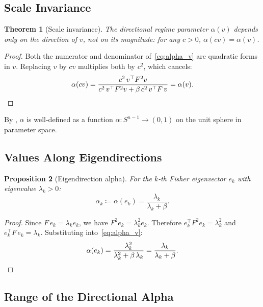 \documentclass[11pt,a4paper]{article}
\theoremstyle{plain}
\newtheorem{theorem}{Theorem}[section]
\newtheorem{proposition}[theorem]{Proposition}
\theoremstyle{definition}
\newcommand{\Sn}{S^{n-1}}
\begin{document}
\subsection{Scale Invariance}

\begin{theorem}[Scale invariance]
\label{thm:scale_invariance}
The directional regime parameter $\alpha(v)$ depends only on the
direction of $v$, not on its magnitude: for any $c > 0$,
$\alpha(cv) = \alpha(v)$.
\end{theorem}

\begin{proof}
Both the numerator and denominator of~\eqref{eq:alpha_v} are
quadratic forms in $v$.  Replacing $v$ by $cv$ multiplies both
by $c^2$, which cancels:
\[
\alpha(cv) = \frac{c^2\, v^\top F^2 v}
                  {c^2\, v^\top F^2 v + \beta\, c^2\, v^\top F\, v}
           = \alpha(v). \qedhere
\]
\end{proof}

By , $\alpha$ is well-defined as a function
$\alpha \colon \Sn \to (0,1)$ on the unit sphere in parameter space.

\subsection{Values Along Eigendirections}

\begin{proposition}[Eigendirection alpha]
\label{prop:eigendirection}
For the $k$-th Fisher eigenvector $e_k$ with eigenvalue
$\lambda_k > 0$:
\begin{equation}
\label{eq:alpha_k}
\alpha_k \coloneqq \alpha(e_k)
  = \frac{\lambda_k}{\lambda_k + \beta}.
\end{equation}
\end{proposition}

\begin{proof}
Since $F\, e_k = \lambda_k e_k$, we have $F^2 e_k =
\lambda_k^2 e_k$.  Therefore $e_k^\top F^2 e_k = \lambda_k^2$
and $e_k^\top F\, e_k = \lambda_k$.  Substituting
into~\eqref{eq:alpha_v}:
\[
\alpha(e_k)
  = \frac{\lambda_k^2}{\lambda_k^2 + \beta\,\lambda_k}
  = \frac{\lambda_k}{\lambda_k + \beta}. \qedhere
\]
\end{proof}

\subsection{Range of the Directional Alpha}
\end{document}
